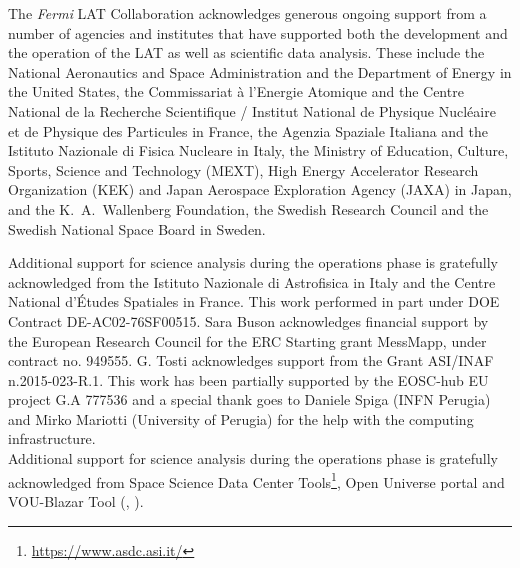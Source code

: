 \documentclass{aastex62}
\newcommand\fermilat{{\it Fermi}-LAT }
\begin{document}
\acknowledgments

The \textit{Fermi} LAT Collaboration acknowledges generous ongoing support from a number of agencies and institutes that have supported both the development and the operation of the LAT as well as scientific data analysis. These include the National Aeronautics and Space Administration and the Department of Energy in the United States, the Commissariat \`a l'Energie Atomique and the Centre National de la Recherche Scientifique / Institut National de Physique Nucl\'eaire et de Physique des Particules in France, the Agenzia Spaziale Italiana and the Istituto Nazionale di Fisica Nucleare in Italy, the Ministry of Education, Culture, Sports, Science and Technology (MEXT), High Energy Accelerator Research Organization (KEK) and Japan Aerospace Exploration Agency (JAXA) in Japan, and the K.~A.~Wallenberg Foundation, the Swedish Research Council and the Swedish National Space Board in Sweden.
 
Additional support for science analysis during the operations phase is gratefully acknowledged from the Istituto Nazionale di Astrofisica in Italy and the Centre National d'\'Etudes Spatiales in France. This work performed in part under DOE Contract DE-AC02-76SF00515.
Sara Buson acknowledges financial support by the European Research Council for the ERC Starting grant MessMapp, under contract no. 949555.
G. Tosti acknowledges support from the Grant ASI/INAF n.2015-023-R.1. 
This work has been partially supported by the EOSC-hub EU project G.A 777536 and a special thank goes to Daniele Spiga (INFN Perugia) and Mirko Mariotti (University of Perugia) for the  help with the computing infrastructure. \\
Additional support for science analysis during the operations phase is gratefully acknowledged from Space Science Data Center Tools\footnote{\url{https://www.asdc.asi.it/}}, Open Universe portal  and VOU-Blazar Tool (\citealt{giommi2020open}, \citealt{giommi2019open}).






\vspace{5mm}
\facilities{\fermilat}





\clearpage
\newpage
\medskip


\end{document}
